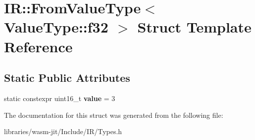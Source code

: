 \hypertarget{struct_i_r_1_1_from_value_type_3_01_value_type_1_1f32_01_4}{}\section{IR\+:\+:From\+Value\+Type$<$ Value\+Type\+:\+:f32 $>$ Struct Template Reference}
\label{struct_i_r_1_1_from_value_type_3_01_value_type_1_1f32_01_4}
\subsection*{Static Public Attributes}
\begin{DoxyCompactItemize}
\item 
\mbox{\label{struct_i_r_1_1_from_value_type_3_01_value_type_1_1f32_01_4_aacea1bf8fa5f2c9a9fb530ba2ffe9513}} 
static constexpr uint16\+\_\+t {\bfseries value} = 3
\end{DoxyCompactItemize}


The documentation for this struct was generated from the following file\+:\begin{DoxyCompactItemize}
\item 
libraries/wasm-\/jit/\+Include/\+I\+R/Types.\+h\end{DoxyCompactItemize}
